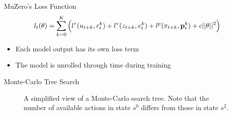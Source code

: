 \begin{frame}{MuZero's Loss Function}
    \begin{equation*}
        l_t(\theta) = \sum^K_{k=0} \left(l^r(u_{t+k}, r_t^k) + l^v(z_{t+k}, v_t^k) + l^p(\pi_{t+k}, \text{\textbf{p}}_t^k) + c||\theta||^2\right)
    \end{equation*}
    \begin{itemize}
        \item Each model output has its own loss term
        \item The model is unrolled through time during training
    \end{itemize}
\end{frame}

\begin{frame}[fragile]{Monte-Carlo Tree Search}
    \begin{figure}
        \centering
        \caption{A simplified view of a Monte-Carlo search tree. Note that the number of available actions in state $s^0$ differs from those in state $s^2$. \nocite{mcts}}
        \label{fig:mcts_simple}
    \end{figure}
\end{frame}
